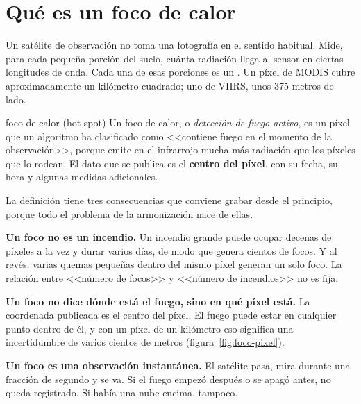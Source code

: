 \section{Qué es un foco de calor}

Un satélite de observación no toma una fotografía en el sentido habitual. Mide, para cada
pequeña porción del suelo, cuánta radiación llega al sensor en ciertas longitudes de onda. Cada
una de esas porciones es un . Un píxel de MODIS cubre aproximadamente un
kilómetro cuadrado; uno de VIIRS, unos 375 metros de lado.

\begin{definicion}{foco de calor (hot spot)}
Un foco de calor, o \emph{detección de fuego activo}, es un píxel que un algoritmo ha
clasificado como <<contiene fuego en el momento de la observación>>, porque emite en el
infrarrojo mucha más radiación que los píxeles que lo rodean. El dato que se publica es el
\textbf{centro del píxel}, con su fecha, su hora y algunas medidas adicionales.
\end{definicion}

La definición tiene tres consecuencias que conviene grabar desde el principio, porque todo el
problema de la armonización nace de ellas.

\textbf{Un foco no es un incendio.} Un incendio grande puede ocupar decenas de píxeles a la vez
y durar varios días, de modo que genera cientos de focos. Y al revés: varias quemas pequeñas
dentro del mismo píxel generan un solo foco. La relación entre <<número de focos>> y <<número
de incendios>> no es fija.

\textbf{Un foco no dice dónde está el fuego, sino en qué píxel está.} La coordenada publicada es
el centro del píxel. El fuego puede estar en cualquier punto dentro de él, y con un píxel de un
kilómetro eso significa una incertidumbre de varios cientos de metros
(figura~\ref{fig:foco-pixel}).

\textbf{Un foco es una observación instantánea.} El satélite pasa, mira durante una fracción de
segundo y se va. Si el fuego empezó después o se apagó antes, no queda registrado. Si había una
nube encima, tampoco.

